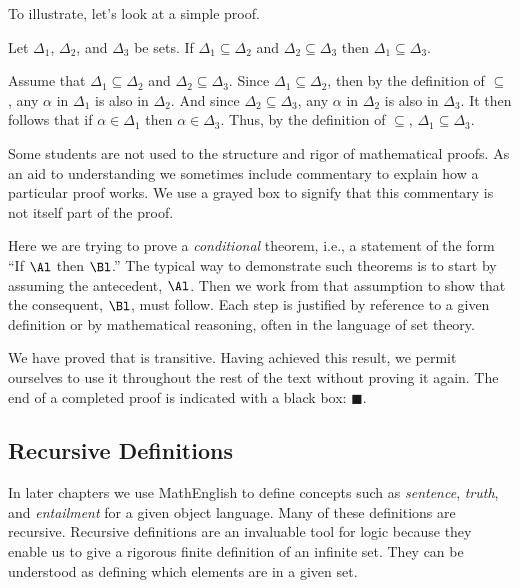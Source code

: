 To illustrate, let's look at a simple proof.

\begin{THEOREM}{}
	Let $\Delta_1$, $\Delta_2$, and $\Delta_3$ be sets.
	If $\Delta_1\subseteq\Delta_2$ and $\Delta_2\subseteq\Delta_3$ then $\Delta_1\subseteq\Delta_3$.
\end{THEOREM}
\begin{PROOF}
	Assume that $\Delta_1\subseteq\Delta_2$ and $\Delta_2\subseteq\Delta_3$.
	Since $\Delta_1\subseteq\Delta_2$, then by the definition of $\subseteq$, any $\alpha$ in $\Delta_1$ is also in $\Delta_2$.
	And since $\Delta_2\subseteq\Delta_3$, any $\alpha$ in $\Delta_2$ is also in $\Delta_3$.
	It then follows that if $\alpha\in\Delta_1$ then $\alpha\in\Delta_3$. 
	Thus, by the definition of $\subseteq$, $\Delta_1\subseteq\Delta_3$.
\end{PROOF}

\begin{commentary}
	Some students are not used to the structure and rigor of mathematical proofs.
	As an aid to understanding we sometimes include commentary to explain how a particular proof works.
	We use a grayed box to signify that this commentary is not itself part of the proof.

	\commentaryspace
	Here we are trying to prove a \emph{conditional} theorem, i.e., a statement of the form ``If $\Al$ then $\Bl$.''
	The typical way to demonstrate such theorems is to start by assuming the antecedent, $\Al$.
	Then we work from that assumption to show that the consequent, $\Bl$, must follow.
	Each step is justified by reference to a given definition or by mathematical reasoning, often in the language of set theory.
\end{commentary}

\noindent{}We have proved that \mention{$\subseteq$} is transitive. 
Having achieved this result, we permit ourselves to use it throughout the rest of the text without proving it again. 
The end of a completed proof is indicated with a black box: $\blacksquare$.

\subsection{Recursive Definitions}\label{Recursive Definitions}

In later chapters we use MathEnglish to define concepts such as \emph{sentence}, \emph{truth}, and \emph{entailment} for a given object language. 
Many of these definitions are recursive.
Recursive definitions are an invaluable tool for logic because they enable us to give a rigorous finite definition of an infinite set.
They can be understood as defining which elements are in a given set.

